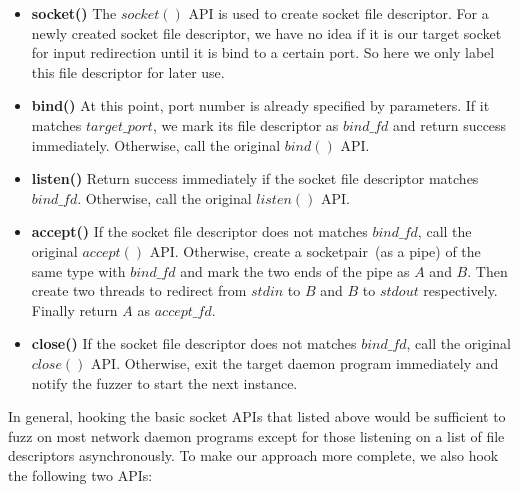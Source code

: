 \begin{itemize}
\item {\bf socket()} The $socket()$ API is used to create socket file descriptor. For a newly created socket file descriptor, we have no idea if it is our target socket for input redirection until it is bind to a certain port. So here we only label this file descriptor for later use.

\item {\bf bind()} At this point, port number is already specified by parameters. If it matches $target\_port$, we mark its file descriptor as $bind\_fd$ and return success immediately. Otherwise, call the original $bind()$ API.

\item {\bf listen()} Return success immediately if the socket file descriptor matches $bind\_fd$. Otherwise, call the original $listen()$ API.

\item {\bf accept()} If the socket file descriptor does not matches $bind\_fd$, call the original $accept()$ API. Otherwise, create a socketpair~(as a pipe) of the same type with $bind\_fd$ and mark the two ends of the pipe as $A$ and $B$. Then create two threads to redirect from $stdin$ to $B$ and $B$ to $stdout$ respectively. Finally return $A$ as $accept\_fd$.

\item {\bf close()} If the socket file descriptor does not matches $bind\_fd$, call the original $close()$ API. Otherwise, exit the target daemon program immediately and notify the fuzzer to start the next instance.

\end{itemize}

In general, hooking the basic socket APIs that listed above would be sufficient to fuzz on most network daemon programs except for those listening on a list of file descriptors asynchronously. To make our approach more complete, we also hook the following two APIs:


